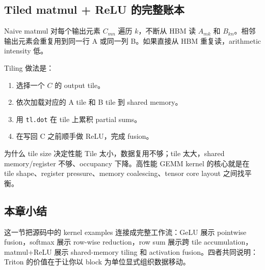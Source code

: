 \subsection{Tiled matmul + ReLU 的完整账本}

Naive matmul 对每个输出元素 \(C_{mn}\) 遍历 \(k\)，不断从 HBM 读 \(A_{mk}\) 和 \(B_{kn}\)。相邻输出元素会重复用到同一行 A 或同一列 B。如果直接从 HBM 重复读，arithmetic intensity 低。

Tiling 做法是：

\begin{enumerate}
    \item 选择一个 \(C\) 的 output tile。
    \item 依次加载对应的 A tile 和 B tile 到 shared memory。
    \item 用 \texttt{tl.dot} 在 tile 上累积 partial sums。
    \item 在写回 C 之前顺手做 ReLU，完成 fusion。
\end{enumerate}

\begin{knowledgebox}{为什么 tile size 决定性能}
Tile 太小，数据复用不够；tile 太大，shared memory/register 不够、occupancy 下降。高性能 GEMM kernel 的核心就是在 tile shape、register pressure、memory coalescing、tensor core layout 之间找平衡。
\end{knowledgebox}

\subsection{本章小结}

这一节把源码中的 kernel examples 连接成完整工作流：GeLU 展示 pointwise fusion，softmax 展示 row-wise reduction，row sum 展示跨 tile accumulation，matmul+ReLU 展示 shared-memory tiling 和 activation fusion。四者共同说明：Triton 的价值在于让你以 block 为单位显式组织数据移动。



